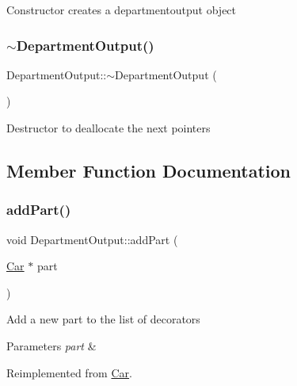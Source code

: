Constructor creates a departmentoutput object \mbox{\label{classDepartmentOutput_afd3aeb3b20f1215d15f7b0498f6c6acb}} 
\subsubsection{\texorpdfstring{$\sim$\+Department\+Output()}{~DepartmentOutput()}}
{\footnotesize\ttfamily Department\+Output\+::$\sim$\+Department\+Output (\begin{DoxyParamCaption}{ }\end{DoxyParamCaption})\hspace{0.3cm}{\ttfamily [virtual]}}

Destructor to deallocate the next pointers 

\subsection{Member Function Documentation}
\mbox{\label{classDepartmentOutput_a8b39539ad1ca3d8026d53dd5ab88be97}} 
\subsubsection{\texorpdfstring{add\+Part()}{addPart()}}
{\footnotesize\ttfamily void Department\+Output\+::add\+Part (\begin{DoxyParamCaption}\item[{\hyperlink{classCar}{Car} $\ast$}]{part }\end{DoxyParamCaption})\hspace{0.3cm}{\ttfamily [virtual]}}

Add a new part to the list of decorators 
\begin{DoxyParams}{Parameters}
{\em part} & \\
\hline
\end{DoxyParams}


Reimplemented from \hyperlink{classCar_a97c6c4d86fd756e496871bda0651c5c6}{Car}.

\mbox{\label{classDepartmentOutput_a6ce74748aa402298902e378ff47c1e49}} 
